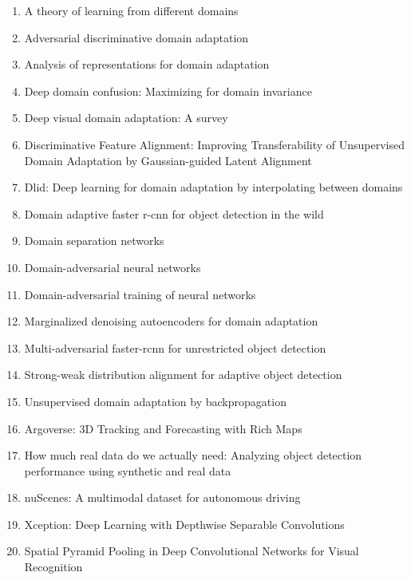 \documentclass[acmlarge]{acmart}
\begin{document}
\begin{enumerate}
	\item A theory of learning from different domains \cite{ben2010theory}
	\item Adversarial discriminative domain adaptation \cite{tzeng2017adversarial}
	\item Analysis of representations for domain adaptation \cite{ben2007analysis}
	\item Deep domain confusion: Maximizing for domain invariance \cite{tzeng2014deep}
	\item Deep visual domain adaptation: A survey \cite{wang2018deep}
	\item Discriminative Feature Alignment: Improving Transferability of Unsupervised Domain Adaptation by Gaussian-guided Latent Alignment \cite{wang2020discriminative}
	\item Dlid: Deep learning for domain adaptation by interpolating between domains \cite{chopra2013dlid}
	\item Domain adaptive faster r-cnn for object detection in the wild \cite{chen2018domain}
	\item Domain separation networks \cite{bousmalis2016domain}
	\item Domain-adversarial neural networks \cite{ajakan2014domain}
	\item Domain-adversarial training of neural networks \cite{ganin2016domain}
	\item Marginalized denoising autoencoders for domain adaptation \cite{chen2012marginalized}
	\item Multi-adversarial faster-rcnn for unrestricted object detection \cite{he2019multi}
	\item Strong-weak distribution alignment for adaptive object detection \cite{saito2019strong}
	\item Unsupervised domain adaptation by backpropagation \cite{ganin2015unsupervised}
	\item Argoverse: 3D Tracking and Forecasting with Rich Maps \cite{chang2019argoverse}
	\item How much real data do we actually need: Analyzing object detection performance using synthetic and real data \cite{nowruzi2019real}
	\item nuScenes: A multimodal dataset for autonomous driving \cite{caesar2019nuscenes}
	\item Xception: Deep Learning with Depthwise Separable Convolutions \cite{chollet2016xception}
	\item Spatial Pyramid Pooling in Deep Convolutional Networks for Visual Recognition \cite{He_2014}

\end{enumerate}
\end{document}

